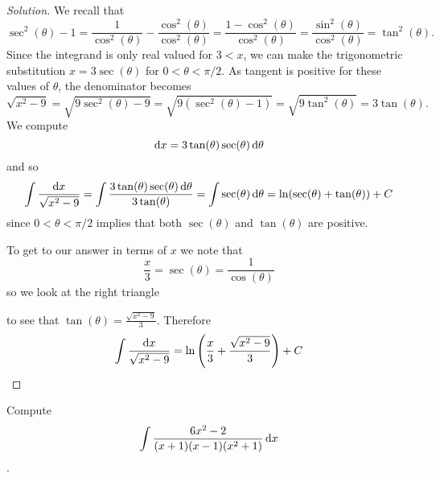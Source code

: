 \documentclass[12pt]{amsart}
\begin{document}
\begin{proof}[Solution]
  We recall that
  \[\sec^2(\theta) - 1 = \frac{1}{\cos^2(\theta)} - \frac{\cos^2(\theta)}{\cos^2(\theta)} = \frac{1 - \cos^2(\theta)}{\cos^2(\theta)} = \frac{\sin^2(\theta)}{\cos^2(\theta)} = \tan^2(\theta).\]
  Since the integrand is only real valued for \(3 < x\), we can make the trigonometric substitution \(x = 3\sec(\theta)\) for \(0 < \theta < \pi/2\).
  As tangent is positive for these values of \(\theta\), the denominator becomes
  \[\sqrt{x^2 - 9} = \sqrt{9\sec^2(\theta) - 9} = \sqrt{9(\sec^2(\theta) - 1)} = \sqrt{9\tan^2(\theta)} = 3\tan(\theta).\]
  We compute
  \[\dif x = 3\tan(\theta)\sec(\theta) \dif\theta\]
  and so
  \[\int \frac{\dif x}{\sqrt{x^2 - 9}} = \int \frac{3\tan(\theta)\sec(\theta)\dif\theta}{3\tan(\theta)} = \int \sec(\theta)\dif\theta = \ln(\sec(\theta) + \tan(\theta)) + C\]
  since \(0 < \theta < \pi/2\) implies that both \(\sec(\theta)\) and \(\tan(\theta)\) are positive.

  To get to our answer in terms of \(x\) we note that
  \[\frac{x}{3} = \sec(\theta) = \frac{1}{\cos(\theta)}\]
  so we look at the right triangle
  \begin{center}
  \end{center}
  to see that \(\tan(\theta) = \frac{\sqrt{x^2 - 9}}{3}\).
  Therefore
  \[\int \frac{\dif x}{\sqrt{x^2 - 9}} = \ln\left(\frac{x}{3} + \frac{\sqrt{x^2 - 9}}{3}\right) + C\]
\end{proof}


\begin{thm}[20 Points]
  Compute \[\int \frac{6x^2 - 2}{(x + 1)(x - 1)(x^2 + 1)}\dif x\].
\end{thm}
\end{document}

